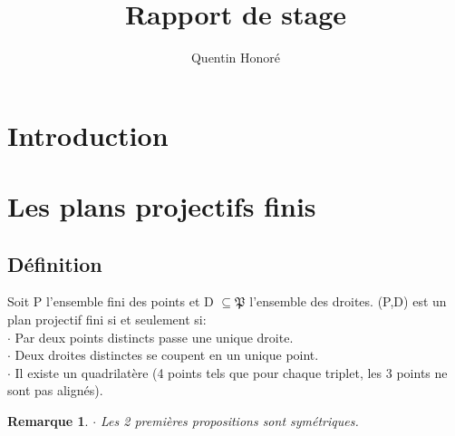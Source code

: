 \documentclass[a4paper]{article}
\title{Rapport de stage}
\newtheorem{Rem}{Remarque}[subsection]
\begin{document}
\author{Quentin Honoré}
\date{}
\maketitle
\newpage
\tableofcontents
\newpage

\section{Introduction}

\section{Les plans projectifs finis}
\subsection{Définition}
Soit P l'ensemble fini des points et D $ \subseteq \mathfrak{P} $ l'ensemble des droites.
(P,D) est un plan projectif fini si et seulement si: \\
$\cdot$ Par deux points distincts passe une unique droite. \\
$\cdot$ Deux droites distinctes se coupent en un unique point. \\
$\cdot$ Il existe un quadrilatère (4 points tels que pour chaque triplet, les 3 points ne sont pas alignés).

\begin{Rem}
$\cdot$ Les 2 premières propositions sont symétriques. \\ 
\end{Rem}
  
\end{document}

